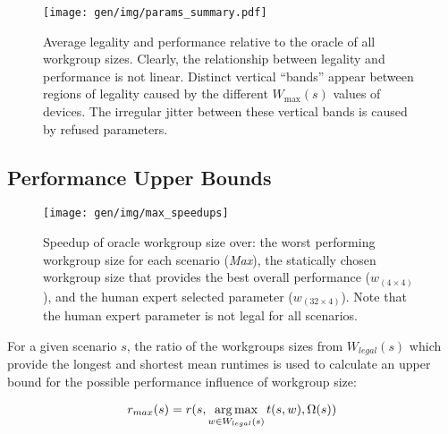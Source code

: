 \begin{figure}
\centering
\texttt{[image: gen/img/params\_summary.pdf]}
\caption{%
  Average legality and performance relative to the oracle of all
  workgroup sizes. Clearly, the relationship between legality and
  performance is not linear. Distinct vertical ``bands'' appear
  between regions of legality caused by the different $W_{\max}(s)$
  values of devices. The irregular jitter between these vertical bands
  is caused by refused parameters.%
}
\label{fig:performance-legality}
\end{figure}


\begin{table}
  \parbox{.45\linewidth}{
    \centering
    \scriptsize
    
    \caption{%
      The 25 workgroup sizes with the greatest legality.%
    }
\label{tab:highest-legality}
  }
  \hfill
  \parbox{.45\linewidth}{
    \centering
    \scriptsize
    
    \caption{%
      The 25 workgroup sizes with the greatest mean
      performance.%
    }
\label{tab:highest-performance}
  }
\end{table}


\subsection{Performance Upper Bounds}

\begin{figure}
  \texttt{[image: gen/img/max\_speedups]}
  \caption{%
    Speedup of oracle workgroup size over: the worst performing
    workgroup size for each scenario (\emph{Max}), the statically
    chosen workgroup size that provides the best overall performance
    ($w_{(4 \times 4)}$), and the human expert selected parameter
    ($w_{(32 \times 4)}$). Note that the human expert parameter is not
    legal for all scenarios.%
  }
\label{fig:speedups}
\end{figure}

For a given scenario $s$, the ratio of the workgroups sizes from
$W_{legal}(s)$ which provide the longest and shortest mean runtimes is
used to calculate an upper bound for the possible performance
influence of workgroup size:

\begin{equation}
r_{max}(s) = r(s, \operatorname*{arg\,max}_{w \in W_{legal}(s)} t(s,w), \Omega(s))
\end{equation}

